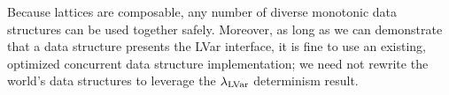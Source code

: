 Because lattices are composable, any number of diverse monotonic data
  structures can be used together safely.
Moreover, as long as we can demonstrate that a data structure presents the LVar interface, it is fine to use an
existing, optimized concurrent data structure implementation; we need not rewrite the world's
data structures to leverage the $\lambda_{\textrm{LVar}}$ determinism result.


